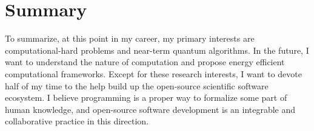 \documentclass[a4paper]{article}
\newcommand{\<}{\langle}
\renewcommand{\>}{\rangle}
\begin{document}
\section{Summary}
To summarize, at this point in my career, my primary interests are computational-hard problems and near-term quantum algorithms.
In the future, I want to understand the nature of computation and propose energy efficient computational frameworks.
Except for these research interests, I want to devote half of my time to the help build up the open-source scientific software ecosystem.
I believe programming is a proper way to formalize some part of human knowledge, and open-source software development is an integrable and collaborative practice in this direction.


\end{document}
